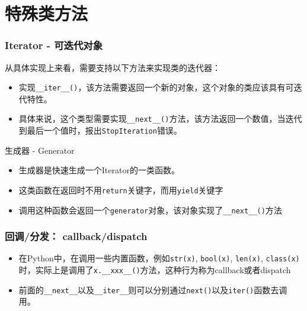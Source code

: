 \documentclass[9pt]{beamer}
\begin{document}
\section{特殊类方法}

\begin{frame}
    \frametitle{Iterator - 可迭代对象}

    从具体实现上来看，需要支持以下方法来实现类的迭代器：

    \begin{itemize}
        \item 实现\texttt{__iter__()}，该方法需要返回一个新的对象，这个对象的类应该具有\alert{可迭代特性}。
        \item 具体来说，这个类型需要实现\texttt{__next__()}方法，该方法返回一个数值，当迭代到最后一个值时，报出\texttt{StopIteration}错误。
    \end{itemize}

    \begin{block}{生成器 - Generator}
        \begin{itemize}
            \item 生成器是快速生成一个Iterator的一类函数。
            \item 这类函数在返回时不用\texttt{return}关键字，而用\texttt{yield}关键字
            \item 调用这种函数会返回一个\texttt{generator}对象，该对象实现了\texttt{__next__()}方法
        \end{itemize}
    \end{block}

\end{frame}

\begin{frame}
    \frametitle{回调/分发： callback/dispatch}

    \begin{itemize}
        \item 在Python中，在调用一些内置函数，例如\texttt{str(x)}, \texttt{bool(x)}, \texttt{len(x)}, \texttt{class(x)}时，实际上是调用了\texttt{x.__xxx__()}方法，这种行为称为callback或者dispatch
        \item 前面的\texttt{__next__}以及\texttt{__iter__}则可以分别通过\texttt{next()}以及\texttt{iter()}函数去调用。
    \end{itemize}

\end{frame}
\end{document}
